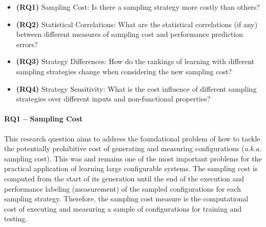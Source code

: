 \begin{itemize}
    \item \textbf{(RQ1)} 
    Sampling Cost: 
    Is there a sampling strategy more costly than others?
    
    \item \textbf{(RQ2)} 
    Statistical Correlations: 
    What are the statistical correlations (if any) between different measures of sampling cost and performance prediction errors? %

    \item \textbf{(RQ3)} 
    Strategy Differences: 
    How do the rankings of learning with different sampling strategies change when considering the new sampling cost?

    \item \textbf{(RQ4)} 
    Strategy Sensitivity: 
    What is the cost influence of different sampling strategies over different inputs and non-functional properties?
\end{itemize}


\paragraph{RQ1 – Sampling Cost}
This research question aims to address the foundational problem of how to tackle the potentially prohibitive cost of generating and measuring configurations (\textit{a.k.a.} sampling cost). %
This was and remains one of the most important problems for the practical application of learning large configurable systems.
The sampling cost is computed from the start of its generation until the end of the execution and performance labeling (\ie measurement) of the sampled configurations for each sampling strategy. 
Therefore, the sampling cost measure is the computational cost of executing and measuring a sample of configurations for training and testing.

